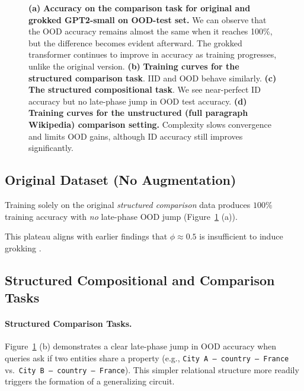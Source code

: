    \begin{figure}[ht]
        \centering
        
        \vspace{-24pt} %
        \caption{
            \textbf{(a)} \textbf{Accuracy on the comparison task for original and grokked GPT2-small on OOD-test set.}
            We can observe that the OOD accuracy remains almost the same when it reaches 100\%, but the difference becomes evident afterward.
            The grokked transformer continues to improve in accuracy as training progresses, unlike the original version.
            \textbf{(b)} \textbf{Training curves for the structured  comparison task}.
            IID and OOD behave similarly.
            \textbf{(c)} \textbf{The structured compositional task}.
            We see near-perfect ID accuracy but no late-phase jump in OOD test accuracy.                
            \textbf{(d)} \textbf{Training curves for the unstructured (full paragraph Wikipedia) comparison setting.}
            Complexity slows convergence and limits OOD gains, although ID accuracy still improves significantly.                
        }
        \label{fig:training_curves}
    \end{figure}

    \subsection{Original Dataset (No Augmentation)}\label{sec:exp_original}
        Training solely on the original \emph{structured comparison} data produces $100\%$ training accuracy with \emph{no} late-phase OOD jump 
        (Figure~\ref{fig:training_curves} (a)). 
    
        This plateau aligns with earlier findings that $\phi \approx 0.5$ is insufficient to induce grokking \citep{wang_grokked_2024}.
    
    \subsection{Structured Compositional and Comparison Tasks}\label{sec:exp_structured}
        \paragraph{Structured Comparison Tasks.}
            Figure~\ref{fig:training_curves} (b) demonstrates a clear late-phase jump in OOD accuracy 
            when queries ask if two entities share a property (e.g., \texttt{City A -- country -- France} vs.\ \texttt{City B -- country -- France}). 
            This simpler relational structure more readily triggers the formation of a generalizing circuit.
        
